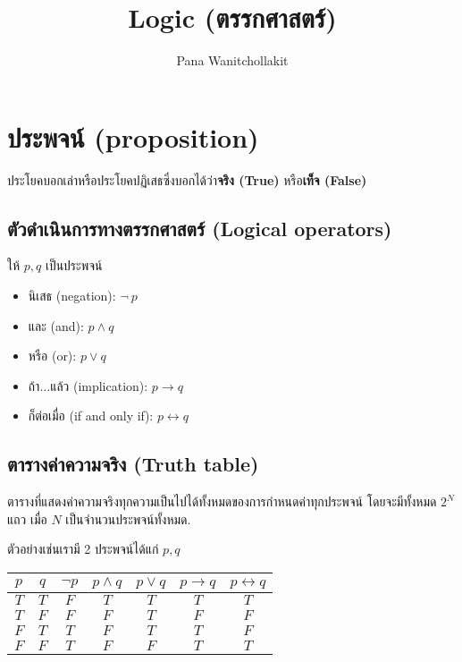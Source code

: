 \documentclass[12pt,a4paper]{article}
\title{
	Logic (ตรรกศาสตร์)
}
\author{
    Pana Wanitchollakit
}
\date{
}
\begin{document}
\maketitle
\section*{ประพจน์ (proposition)}
ประโยคบอกเล่าหรือประโยคปฏิเสธซึ่งบอกได้ว่า\textbf{จริง (True)} หรือ\textbf{เท็จ (False)}
\subsection*{ตัวดำเนินการทางตรรกศาสตร์ (Logical operators)}
ให้ $p, q$ เป็นประพจน์
\begin{itemize}
    \item นิเสธ (negation): $\neg\ p$
    \item และ (and): $p\land q$
    \item หรือ (or): $p \lor q$
    \item ถ้า$\ldots$แล้ว (implication): $p \rightarrow q$
    \item ก็ต่อเมื่อ (if and only if): $p\leftrightarrow q$
\end{itemize}
\subsection*{ตารางค่าความจริง (Truth table)}
\quad ตารางที่แสดงค่าความจริงทุกความเป็นไปได้ทั้งหมดของการกำหนดค่าทุกประพจน์ โดยจะมีทั้งหมด $2^N$ แถว เมื่อ $N$ เป็นจำนวนประพจน์ทั้งหมด. \\
\rule{0pt}{4ex}
ตัวอย่างเช่นเรามี 2 ประพจน์ได้แก่ $p, q$\\
\begin{center}
    \begin{tabular}{|c|c||c|c|c|c|c|}
        \hline
        $p$ & $q$ & $\neg p$ & $p \land q$ & $p \lor q$ & $p \rightarrow q$ & $p \leftrightarrow q$ \\
        \hline
        $T$ & $T$ & $F$      & $T$         & $T$        & $T$               & $T$                   \\
        \hline
        $T$ & $F$ & $F$      & $F$         & $T$        & $F$               & $F$                   \\
        \hline
        $F$ & $T$ & $T$      & $F$         & $T$        & $T$               & $F$                   \\
        \hline
        $F$ & $F$ & $T$      & $F$         & $F$        & $T$               & $T$                   \\
        \hline
    \end{tabular}
\end{center}
\end{document}
